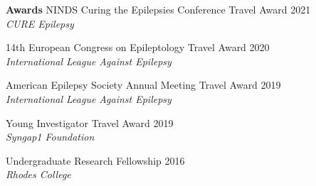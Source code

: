 \documentclass{resume} %
\begin{document}
   

\begin{rSection}{{\bfseries Awards}}
    NINDS Curing the Epilepsies Conference Travel Award \hfill {2021}
    \\ \emph{CURE Epilepsy} 
   
   14th European Congress on Epileptology Travel Award \hfill{2020}
   \\ \emph{International League Against Epilepsy}
   
   American Epilepsy Society Annual Meeting Travel Award \hfill{2019}
   \\ \emph{International League Against Epilepsy}
   
   Young Investigator Travel Award \hfill{2019}
   \\ \emph{Syngap1 Foundation}
   
   Undergraduate Research Fellowship \hfill{2016}
   \\ \emph{Rhodes College}
       \end{rSection}
\end{document}
